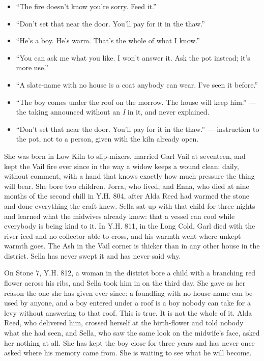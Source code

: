 \documentclass{design/chronicle}
\begin{document}
{\begin{itemize}[leftmargin=1.4em,itemsep=1pt,topsep=3pt,parsep=0pt]
\item “The fire doesn’t know you’re sorry. Feed it.”

\item “Don’t set that near the door. You’ll pay for it in the thaw.”

\item “He’s a boy. He’s warm. That’s the whole of what I know.”

\item “You can ask me what you like. I won’t answer it. Ask the pot instead; it’s more use.”

\item “A slate-name with no house is a coat anybody can wear. I’ve seen it before.”

\item “The boy comes under the roof on the morrow. The house will keep him.” --- the taking announced without an \emph{I} in it, and never explained.

\item “Don’t set that near the door. You’ll pay for it in the thaw.” --- instruction to the pot, not to a person, given with the kiln already open.

\end{itemize}

She was born in Low Kiln to slip-mixers, married Garl Vail at seventeen, and kept the Vail fire ever since in the way a widow keeps a wound clean: daily, without comment, with a hand that knows exactly how much pressure the thing will bear. She bore two children. Jorra, who lived, and Enna, who died at nine months of the second chill in Y.H. 804, after Alda Reed had warmed the stone and done everything the craft knew. Sella sat up with that child for three nights and learned what the midwives already knew: that a vessel can cool while everybody is being kind to it. In Y.H. 811, in the Long Cold, Garl died with the river iced and no collector able to cross, and his warmth went where unkept warmth goes. The Ash in the Vail corner is thicker than in any other house in the district. Sella has never swept it and has never said why.

On Stone 7, Y.H. 812, a woman in the district bore a child with a branching red flower across his ribs, and Sella took him in on the third day. She gave as her reason the one she has given ever since: a foundling with no house-name can be used by anyone, and a boy entered under a roof is a boy nobody can take for a levy without answering to that roof. This is true. It is not the whole of it. Alda Reed, who delivered him, crossed herself at the birth-flower and told nobody what she had seen, and Sella, who saw the same look on the midwife’s face, asked her nothing at all. She has kept the boy close for three years and has never once asked where his memory came from. She is waiting to see what he will become.

}
\end{document}
